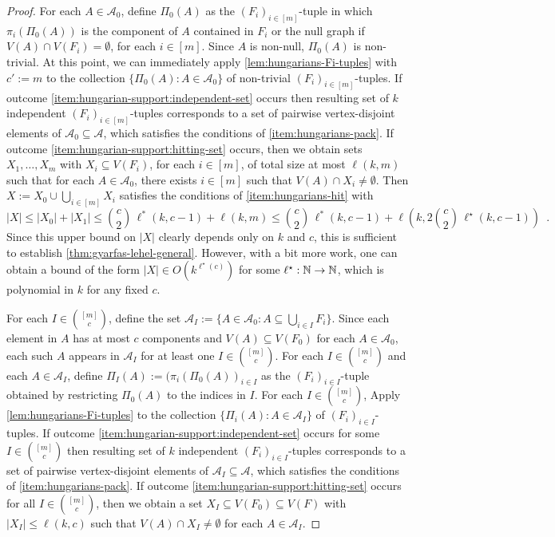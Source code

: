 \documentclass{patmorin}
\begin{document}
\begin{proof}

  For each $A\in\mathcal{A}_0$, define $\Pi_0(A)$ as the $(F_i)_{i\in[m]}$-tuple in which $\pi_i(\Pi_0(A))$ is the component of $A$ contained in $F_i$ or the null graph if $V(A)\cap V(F_i)=\emptyset$, for each $i\in[m]$.  Since $A$ is non-null, $\Pi_0(A)$ is non-trivial.
  At this point, we can immediately apply \cref{lem:hungarians-Fi-tuples} with $c':=m$ to the collection $\{\Pi_0(A):A\in \mathcal{A}_0\}$ of non-trivial $(F_i)_{i\in[m]}$-tuples.  If outcome \cref{item:hungarian-support:independent-set} occurs then resulting set of $k$ independent $(F_i)_{i\in[m]}$-tuples corresponds to a set of pairwise vertex-disjoint elements of $\mathcal{A}_0\subseteq \mathcal{A}$, which satisfies the conditions of \cref{item:hungarians-pack}.  If outcome \cref{item:hungarian-support:hitting-set} occurs, then we obtain sets $X_1,\ldots,X_m$ with $X_i\subseteq V(F_i)$, for each $i\in[m]$, of total size at most $\ell(k,m)$ such that for each $A\in\mathcal{A}_0$, there exists $i\in[m]$ such that $V(A)\cap X_i\neq\emptyset$.  Then $X:=X_0\cup \bigcup_{i\in[m]}X_i$ satisfies the conditions of \cref{item:hungarians-hit} with 
  \[
     \textstyle |X|\le |X_0|+|X_1|\le \binom{c}{2}\,\ell^*(k,c-1) + \ell(k,m)
     \le \binom{c}{2}\,\ell^*(k,c-1) + \ell(k,2\binom{c}{2}\,\ell^\star(k,c-1)) \enspace .
  \]
  Since this upper bound on $|X|$ clearly depends only on $k$ and $c$, this is sufficient to establish \cref{thm:gyarfas-lehel-general}.  However, with a bit more work, one can obtain a bound of the form $|X|\in O(k^{\ell^\star(c)})$ for some $\ell^\star:\mathbb{N}\to\mathbb{N}$, which is polynomial in $k$ for any fixed $c$. 

  For each $I\in\binom{[m]}{c}$, define the set $\mathcal{A}_I:=\{A\in\mathcal{A}_0:A\subseteq \bigcup_{i\in I}F_i\}$.  Since each element in $A$ has at most $c$ components and $V(A)\subseteq V(F_0)$ for each $A\in \mathcal{A}_0$, each such $A$ appears in $\mathcal{A}_I$ for at least one $I\in\binom{[m]}{c}$.  For each $I\in\binom{[m]}{c}$ and each $A\in\mathcal{A}_I$, define $\Pi_I(A):=(\pi_i(\Pi_0(A))_{i\in I}$ as the $(F_i)_{i\in I}$-tuple obtained by restricting $\Pi_0(A)$ to the indices in $I$.  For each $I\in\binom{[m]}{c}$,  Apply \cref{lem:hungarians-Fi-tuples} to the collection $\{\Pi_i(A):A\in \mathcal{A}_I\}$ of $(F_i)_{i\in I}$-tuples.  If outcome \cref{item:hungarian-support:independent-set} occurs for some $I\in\binom{[m]}{c}$ then resulting set of $k$ independent $(F_i)_{i\in I}$-tuples corresponds to a set of pairwise vertex-disjoint elements of $\mathcal{A}_I\subseteq \mathcal{A}$, which satisfies the conditions of \cref{item:hungarians-pack}.  If outcome \cref{item:hungarian-support:hitting-set} occurs for all $I\in\binom{[m]}{c}$, then we obtain a set $X_I\subseteq V(F_0)\subseteq V(F)$ with $|X_I|\le \ell(k,c)$ such that $V(A)\cap X_I\neq\emptyset$ for each $A\in\mathcal{A}_I$.


\end{proof}
\end{document}
